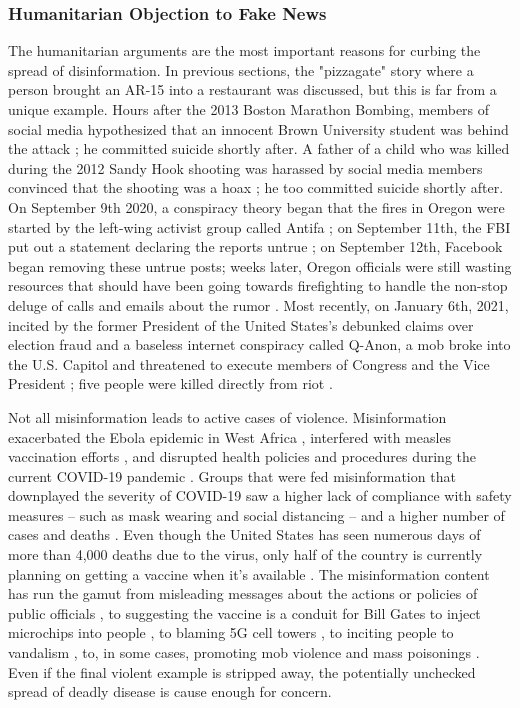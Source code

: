 \documentclass[12pt]{article}
\begin{document}
\subsubsection{Humanitarian Objection to Fake News}
The humanitarian arguments are the most important reasons for curbing the spread of disinformation. In previous sections, the "pizzagate" story where a person brought an AR-15 into a restaurant was discussed, but this is far from a unique example. Hours after the 2013 Boston Marathon Bombing, members of social media hypothesized that an innocent Brown University student was behind the attack \cite{starbird2014rumors}; he committed suicide shortly after. A father of a child who was killed during the 2012 Sandy Hook shooting was harassed by social media members convinced that the shooting was a hoax \cite{williamson2019alex}; he too committed suicide shortly after. On September 9th 2020, a conspiracy theory began that the fires in Oregon were started by the left-wing activist group called Antifa \cite{robinson2020oregon}; on September 11th, the FBI put out a statement declaring the reports untrue \cite{fbi2020portland}; on September 12th, Facebook began removing these untrue posts; weeks later, Oregon officials were still wasting resources that should have been going towards firefighting to handle the non-stop deluge of calls and emails about the rumor \cite{wilson2020oregon}. Most recently, on January 6th, 2021, incited by the former President of the United States's debunked claims over election fraud and a baseless internet conspiracy called Q-Anon, a mob broke into the U.S. Capitol and threatened to execute members of Congress and the Vice President \cite{fandos2021trump}; five people were killed directly from riot \cite{Levenson2021capitol}.

Not all misinformation leads to active cases of violence. Misinformation exacerbated the Ebola epidemic in West Africa \cite{shultz2016role}, interfered with measles vaccination efforts \cite{hussain2018anti}, and disrupted health policies and procedures during the current COVID-19 pandemic \cite{bagherpour2020covid,world2020novel,zarocostas2020fight,depoux2020pandemic,habersaat2020ten,van2020using}. Groups that were fed misinformation that downplayed the severity of COVID-19 saw a higher lack of compliance with safety measures -- such as mask wearing and social distancing -- and a higher number of cases and deaths \cite{bursztyn2020misinformation}. Even though the United States has seen numerous days of more than 4,000 deaths due to the virus, only half of the country is currently planning on getting a vaccine when it's available \cite{cornwall2020just}. The misinformation content has run the gamut from misleading messages about the actions or policies of public officials \cite{brennen2020types}, to suggesting the vaccine is a conduit for Bill Gates to inject microchips into people \cite{sanders2020difference}, to blaming 5G cell towers \cite{jolley2020pylons,goodman2020coronavirus}, to inciting people to vandalism \cite{spring2020coronavirus}, to, in some cases, promoting mob violence and mass poisonings \cite{depoux2020pandemic}. Even if the final violent example is stripped away, the potentially unchecked spread of deadly disease is cause enough for concern. 
\end{document}
